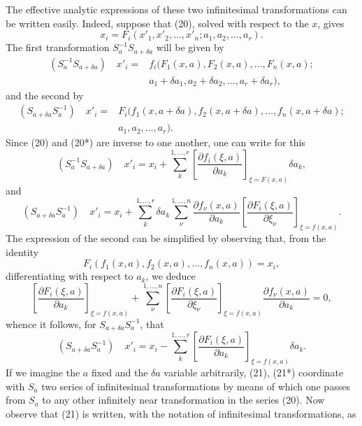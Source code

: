\documentclass[11pt]{book}
\begin{document}
The effective analytic expressions of these two infinitesimal transformations can be written easily. Indeed, suppose that (20), solved with respect to the $x$, gives
\begin{equation*}\tag{20*}
 x_i=F_i(x'_1,x'_2,\ldots,x'_n; a_1,a_2,\ldots,a_r).
\end{equation*}
The first transformation $S_a^{-1}S_{a+\delta a}$ will be given by
\[
\begin{aligned}
(S_a^{-1}S_{a+\delta a})\quad x'_i={}&f_i\bigl(F_1(x,a),F_2(x,a),\ldots,F_n(x,a);\\
& a_1+\delta a_1,a_2+\delta a_2,\ldots,a_r+\delta a_r\bigr),
\end{aligned}
\]
and the second by
\[
\begin{aligned}
(S_{a+\delta a}S_a^{-1})\quad x'_i={}&F_i\bigl(f_1(x,a+\delta a),f_2(x,a+\delta a),\ldots,f_n(x,a+\delta a);\\
& a_1,a_2,\ldots,a_r\bigr).
\end{aligned}
\]
Since (20) and (20*) are inverse to one another, one can write for this
\begin{equation*}\tag{21}
(S_a^{-1}S_{a+\delta a})\quad
 x'_i=x_i+\sum\limits_k^{1,\ldots,r}\left[\frac{\partial f_i(\xi,a)}{\partial a_k}\right]_{\xi=F(x,a)}\delta a_k,
\end{equation*}
and
\[
(S_{a+\delta a}S_a^{-1})\quad
 x'_i=x_i+\sum\limits_k^{1,\ldots,r}\delta a_k\sum\limits_\nu^{1,\ldots,n}\frac{\partial f_\nu(x,a)}{\partial a_k}
 \left[\frac{\partial F_i(\xi,a)}{\partial \xi_\nu}\right]_{\xi=f(x,a)}.
\]
The expression of the second can be simplified by observing that, from the identity
\[
 F_i(f_1(x,a),f_2(x,a),\ldots,f_n(x,a))=x_i,
\]
differentiating with respect to $a_k$, we deduce
\[
 \left[\frac{\partial F_i(\xi,a)}{\partial a_k}\right]_{\xi=f(x,a)}+
 \sum\limits_\nu^{1,\ldots,n}\left[\frac{\partial F_i(\xi,a)}{\partial \xi_\nu}\right]_{\xi=f(x,a)}\frac{\partial f_\nu(x,a)}{\partial a_k}=0,
\]
whence it follows, for $S_{a+\delta a}S_a^{-1}$, that
\begin{equation*}\tag{21*}
(S_{a+\delta a}S_a^{-1})\quad
 x'_i=x_i-\sum\limits_k^{1,\ldots,r}\left[\frac{\partial F_i(\xi,a)}{\partial a_k}\right]_{\xi=f(x,a)}\delta a_k.
\end{equation*}
If we imagine the $a$ fixed and the $\delta a$ variable arbitrarily, (21), (21*) coordinate with $S_a$ two series of infinitesimal transformations by means of which one passes from $S_a$ to any other infinitely near transformation in the series (20). Now observe that (21) is written, with the notation of infinitesimal transformations, as
\end{document}

